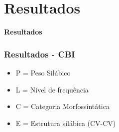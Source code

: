 \documentclass[xcolor=table]{beamer}
\begin{document}
	\section{Resultados}
	\begin{frame}
		\centering \textbf{Resultados}
	\end{frame}
	\begin{frame}
		\frametitle{Resultados - CBI}
		\begin{itemize}

			\item P = Peso Silábico\\
			\item L = Nível de frequência\\
			\item C = Categoria Morfossintática\\
			\item E = Estrutura silábica (CV-CV)\\
		\end{itemize}
	\end{frame}
	
\end{document}

